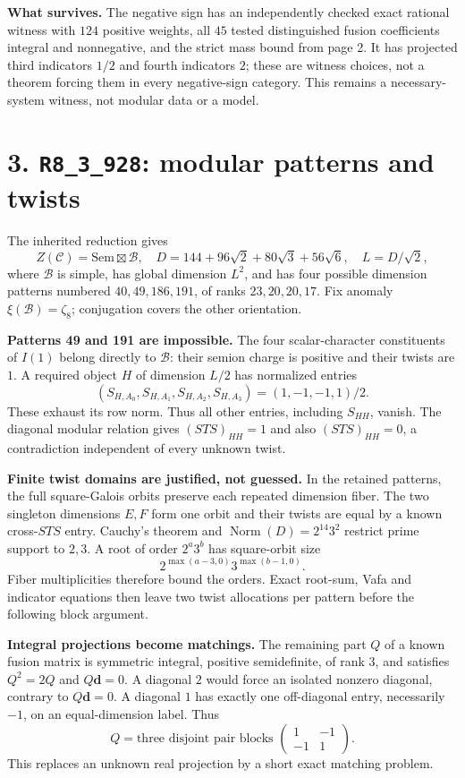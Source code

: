\documentclass[11pt,a4paper]{article}
\newcommand{\R}[1]{\texttt{#1}}
\newcommand{\z}{\zeta}
\begin{document}
\textbf{What survives.} The negative sign has an independently checked exact rational witness with $124$ positive weights, all $45$ tested distinguished fusion coefficients integral and nonnegative, and the strict mass bound from page 2. It has projected third indicators $1/2$ and fourth indicators $2$; these are witness choices, not a theorem forcing them in every negative-sign category. This remains a necessary-system witness, not modular data or a model.

\newpage
\section*{3. \R{R8\_3\_928}: modular patterns and twists}
The inherited reduction gives
\[
Z(\mathcal C)=\mathrm{Sem}\boxtimes\mathcal B,\quad
D=144+96\sqrt2+80\sqrt3+56\sqrt6,\quad L=D/\sqrt2,
\]
where $\mathcal B$ is simple, has global dimension $L^2$, and has four possible dimension patterns numbered $40,49,186,191$, of ranks $23,20,20,17$. Fix anomaly $\xi(\mathcal B)=\z_8$; conjugation covers the other orientation.

\textbf{Patterns 49 and 191 are impossible.} The four scalar-character constituents of $I(1)$ belong directly to $\mathcal B$: their semion charge is positive and their twists are $1$. A required object $H$ of dimension $L/2$ has normalized entries
\[
(S_{H,A_0},S_{H,A_1},S_{H,A_2},S_{H,A_3})=(1,-1,-1,1)/2.
\]
These exhaust its row norm. Thus all other entries, including $S_{HH}$, vanish. The diagonal modular relation gives $(STS)_{HH}=1$ and also $(STS)_{HH}=0$, a contradiction independent of every unknown twist.

\textbf{Finite twist domains are justified, not guessed.} In the retained patterns, the full square-Galois orbits preserve each repeated dimension fiber. The two singleton dimensions $E,F$ form one orbit and their twists are equal by a known cross-$STS$ entry. Cauchy's theorem and $\operatorname{Norm}(D)=2^{14}3^2$ restrict prime support to $2,3$. A root of order $2^a3^b$ has square-orbit size
\[
2^{\max(a-3,0)}3^{\max(b-1,0)}.
\]
Fiber multiplicities therefore bound the orders. Exact root-sum, Vafa and indicator equations then leave two twist allocations per pattern before the following block argument.

\textbf{Integral projections become matchings.} The remaining part $Q$ of a known fusion matrix is symmetric integral, positive semidefinite, of rank $3$, and satisfies $Q^2=2Q$ and $Q\mathbf d=0$. A diagonal $2$ would force an isolated nonzero diagonal, contrary to $Q\mathbf d=0$. A diagonal $1$ has exactly one off-diagonal entry, necessarily $-1$, on an equal-dimension label. Thus
\[
Q=\text{three disjoint pair blocks }\begin{pmatrix}1&-1\\-1&1\end{pmatrix}.
\]
This replaces an unknown real projection by a short exact matching problem.
\end{document}
